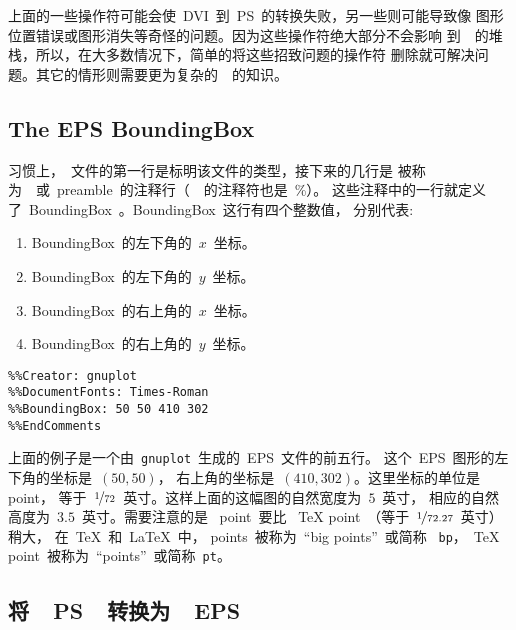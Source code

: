 上面的一些操作符可能会使~DVI~到~PS~的转换失败，另一些则可能导致像
图形位置错误或图形消失等奇怪的问题。因为这些操作符绝大部分不会影响
到~\PS{}~的堆栈，所以，在大多数情况下，简单的将这些招致问题的操作符
删除就可解决问题。其它的情形则需要更为复杂的~\PS{}~的知识。

\subsection[The EPS BoundingBox]{The EPS BoundingBox}\label{ssec:bbox}

习惯上，\PS{}~文件的第一行是标明该文件的类型，接下来的几行是
被称为~~或~preamble~的注释行（~\PS{}~的注释符也是~\%）。
这些注释中的一行就定义了~BoundingBox~。BoundingBox~这行有四个整数值，
分别代表:

\begin{minipage}{.9\linewidth}
	\noindent
	\addtolength{\itemsep}{-5pt}
	\begin{enumerate}
		\item BoundingBox~的左下角的~$x$~坐标。
		\item BoundingBox~的左下角的~$y$~坐标。
		\item BoundingBox~的右上角的~$x$~坐标。
		\item BoundingBox~的右上角的~$y$~坐标。
	\end{enumerate}
	\addtolength{\itemsep}{5pt}
\end{minipage}

\vspace{1cm}

\begin{Verbatim}[frame=single,rulecolor=\color{mygreen},%
label={\CJKfamily{hei} EPS~文件头示例}]
%!PS-Adobe-2.0 EPSF-2.0
%%Creator: gnuplot
%%DocumentFonts: Times-Roman
%%BoundingBox: 50 50 410 302
%%EndComments
\end{Verbatim}

上面的例子是一个由~\texttt{gnuplot}~生成的~EPS~文件的前五行。
这个~EPS~图形的左下角的坐标是~$(50,50)$，
右上角的坐标是~$(410,302)$。这里坐标的单位是~\PS{} point，
等于~$\nicefrac{1}{72}$~英寸。这样上面的这幅图的自然宽度为~$5$~英寸，
相应的自然高度为~$3.5$~英寸。需要注意的是~\PS{} point~要比
~\TeX{} point~（等于~$\nicefrac{1}{72.27}$~英寸）稍大，
在~\TeX{}~和~\LaTeX{}~中，\PS{} points~被称为~``big points''~或简称
~\texttt{bp}，~\TeX{} point~被称为~``points''~或简称~\texttt{pt}。

\subsection[将~PS~转换为~EPS]{将~~PS~~转换为~~EPS}\label{ssec:pstoeps}

